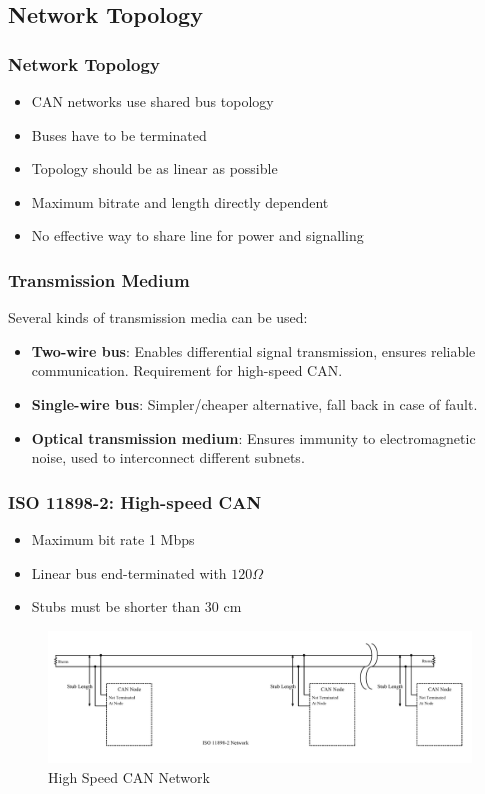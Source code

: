 \documentclass{beamer}
\begin{document}
\subsection{Network Topology}
\begin{frame}
	\frametitle{Network Topology}
	\begin{itemize}
		\item CAN networks use shared bus topology
		\item Buses have to be terminated
		\item Topology should be as linear as possible
		\item Maximum bitrate and length directly dependent
		\item No effective way to share line for power and signalling
	\end{itemize}
\end{frame}

\begin{frame}
	\frametitle{Transmission Medium}
	Several kinds of transmission media can be used:
	\begin{itemize}
		\item \textbf{Two-wire bus}: Enables differential signal transmission, ensures reliable communication. Requirement for high-speed CAN.
		\item \textbf{Single-wire bus}: Simpler/cheaper alternative, fall back in case of fault.
		\item \textbf{Optical transmission medium}: Ensures immunity to electromagnetic noise, used to interconnect different subnets.
	\end{itemize}
\end{frame}

\begin{frame}
	\frametitle{ISO 11898-2: High-speed CAN}
	\begin{itemize}
		\item Maximum bit rate 1 Mbps
		\item Linear bus end-terminated with $120 \Omega$
		\item Stubs must be shorter than 30 cm
	\end{itemize}
	\begin{figure}
\includegraphics[width=.75\textwidth]{highspeed.png} 
\caption{High Speed CAN Network \cite{iso118982}}
\end{figure}
\end{frame}
\end{document}
